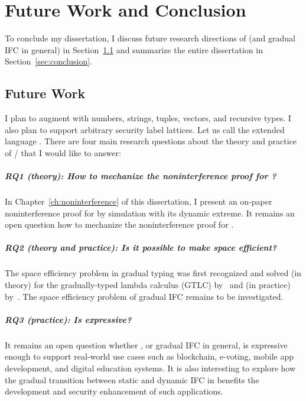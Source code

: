 \chapter{Future Work and Conclusion}
\label{ch:conclusion}

To conclude my dissertation, I discuss future research directions of \Surface
(and gradual IFC in general) in Section~\ref{sec:future} and summarize the
entire dissertation in Section~\ref{sec:conclusion}.

\section{Future Work}
\label{sec:future}

I plan to augment \Surface with numbers, strings, tuples, vectors, and recursive
types. I also plan to support arbitrary security label lattices. Let us call the
extended language \SurfacePlus. There are four main research questions about the
theory and practice of \Surface / \SurfacePlus that I would like to answer:

\paragraph{RQ1 (theory): How to mechanize the noninterference proof for \Surface?}
In Chapter~\ref{ch:noninterference} of this dissertation, I present an on-paper
noninterference proof for \Surface by simulation with its dynamic extreme. It
remains an open question how to mechanize the noninterference proof for
\Surface.

\paragraph{RQ2 (theory and practice): Is it possible to make \Surface space efficient?} The
space efficiency problem in gradual typing was first recognized and solved (in
theory) for the gradually-typed lambda calculus (GTLC)
by~\textcite{Herman:2006uq,Herman:2010aa} and (in practice)
by~\textcite{Kuhlenschmidt:2019aa}. The space efficiency problem of gradual IFC
remains to be investigated.

\paragraph{RQ3 (practice): Is \SurfacePlus expressive?} It remains an open
question whether \SurfacePlus, or gradual IFC in general, is expressive enough
to support real-world use cases such as blockchain, e-voting, mobile app
development, and digital education systems. It is also interesting to explore
how the gradual transition between static and dynamic IFC in \SurfacePlus
benefits the development and security enhancement of such applications.

